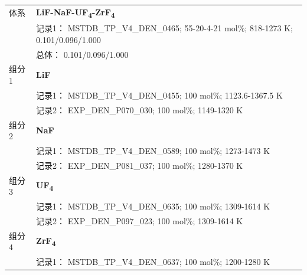 \documentclass[12pt]{article}
\begin{document}
{\begin{longtable}[]{@{}
  >{\raggedright\arraybackslash}p{}
  >{\raggedright\arraybackslash}p{}@{}}
\midrule
体系 & \textbf{LiF-NaF-UF\textsubscript{4}-ZrF\textsubscript{4}} \\
 & 记录1： MSTDB\_TP\_V4\_DEN\_0465; 55-20-4-21 mol\%; 818-1273 K; 0.101/0.096/1.000 \\
 & 总体： 0.101/0.096/1.000  \\

组分 1  & \textbf{LiF} \\
 & 记录1： MSTDB\_TP\_V4\_DEN\_0455; 100 mol\%; 1123.6-1367.5 K \\
 & 记录2： EXP\_DEN\_P070\_030; 100 mol\%; 1149-1320 K  \\

组分 2  & \textbf{NaF} \\
 & 记录1： MSTDB\_TP\_V4\_DEN\_0589; 100 mol\%; 1273-1473 K \\
 & 记录2： EXP\_DEN\_P081\_037; 100 mol\%; 1280-1370 K  \\

组分 3  & \textbf{UF\textsubscript{4}} \\
 & 记录1： MSTDB\_TP\_V4\_DEN\_0635; 100 mol\%; 1309-1614 K \\
 & 记录2： EXP\_DEN\_P097\_023; 100 mol\%; 1309-1614 K  \\

组分 4  & \textbf{ZrF\textsubscript{4}} \\
 & 记录1： MSTDB\_TP\_V4\_DEN\_0637; 100 mol\%; 1200-1280 K  \\


\end{longtable}}
\end{document}
